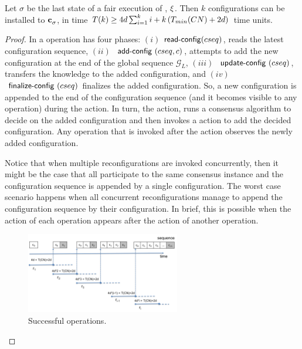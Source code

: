 \begin{lemma}
	\label{lem:configdelay}
	Let $\sigma$ be the last state of a fair execution of \ares{}, $\EX$. 
	Then $k$ configurations can be installed to $\mathbf{c}^{}_{\sigma}$, in time
	$T(k) \geq 4d\sum_{i=1}^{k}i+ k\left(T_{min}(CN)+2d\right)$ time units.
\end{lemma}

\begin{proof}
    In \ares{} a  operation has 
four phases: $(i)$ $\act{read-config}(cseq)$,  reads the latest configuration sequence, 
$(ii)$ $\text{\act{add-config}}(cseq, c)$,  attempts to add  the new configuration 
at the end of the global sequence $\mathcal{G}_L$, 
$(iii)$ $\text{\act{update-config}}(cseq)$,   transfers the knowledge to the added configuration,
and 
$(iv)$  $\text{\act{finalize-config}}(cseq)$ finalizes the added configuration. So, a new configuration is appended to the 
end of the configuration sequence (and it becomes visible to any operation) during the 
 action.  In turn, the  action, runs a consensus algorithm
to decide on the added configuration and then invokes a  action to add
the decided configuration. Any operation that is invoked after the  action 
observes the newly added configuration. 

Notice that when multiple reconfigurations are invoked concurrently, then it might be the case 
that all participate to the same consensus instance and the configuration sequence is appended 
by a single configuration. The worst case scenario happens when all concurrent reconfigurations
manage to append the configuration sequence by their configuration. In brief, this is possible when 
the  action of each  operation appears after the 
action of another  operation. 

\begin{figure}[ht]
	\begin{center}
		\includegraphics[width=0.60\textwidth]{reconfigExec.png}
		\caption{Successful  operations.}
		\label{fig:reconfigExec}
	\end{center}
\end{figure}


\end{proof}
